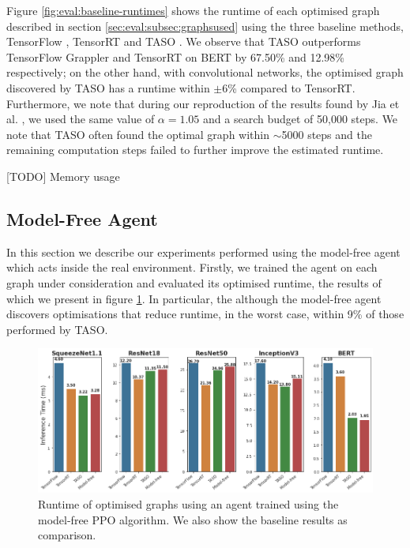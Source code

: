 Figure \ref{fig:eval:baseline-runtimes} shows the runtime of each optimised graph described in section \ref{sec:eval:subsec:graphsused} using the three baseline methods, TensorFlow \cite{tensorflow2015-whitepaper}, TensorRT \cite{tensorrt2017} and TASO \cite{jia2019taso}. We observe that TASO outperforms TensorFlow Grappler and TensorRT on BERT by 67.50\% and 12.98\% respectively; on the other hand, with convolutional networks, the optimised graph discovered by TASO has a runtime within $\pm 6$\% compared to TensorRT. Furthermore, we note that during our reproduction of the results found by Jia et al. \cite{jia2019taso}, we used the same value of $\alpha = 1.05$ and a search budget of 50,000 steps. We note that TASO often found the optimal graph within $\sim$5000 steps and the remaining computation steps failed to further improve the estimated runtime.

[TODO] Memory usage


\subsection{Model-Free Agent}
\label{sec:eval:subsec:mfagent}

In this section we describe our experiments performed using the model-free agent which acts inside the real environment. Firstly, we trained the agent on each graph under consideration and evaluated its optimised runtime, the results of which we present in figure \ref{fig:eval:mf-agent-runtimes}. In particular, the although the model-free agent discovers optimisations that reduce runtime, in the worst case, within 9\% of those performed by TASO.

\begin{figure}[h]
  \centering
  \includegraphics[width=1\columnwidth]{sections/5evaluation/images/runtimes_mf.png}
  \caption[Runtimes of optimised graphs using MF-RL]{Runtime of optimised graphs using an agent trained using the model-free PPO algorithm. We also show the baseline results as comparison.}
  \label{fig:eval:mf-agent-runtimes}
\end{figure}


